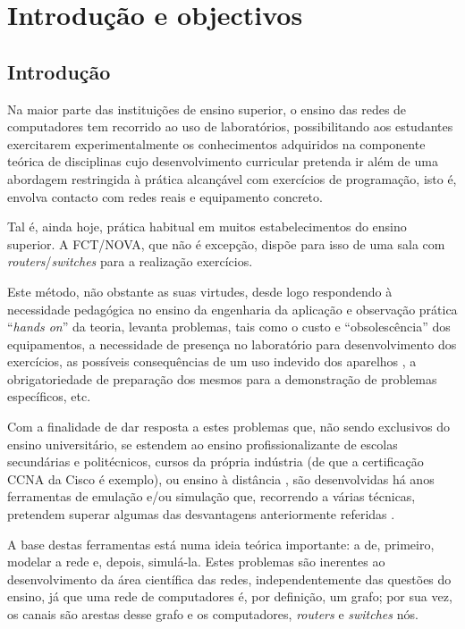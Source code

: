 
\chapter{Introdução e objectivos}

\section{Introdução}
\label{sec:intro}

Na maior parte das instituições de ensino superior, o ensino das redes de computadores tem recorrido ao uso de laboratórios, possibilitando aos estudantes exercitarem experimentalmente os conhecimentos adquiridos na componente teórica de disciplinas cujo desenvolvimento curricular pretenda ir além de uma abordagem restringida à prática alcançável com exercícios de programação, isto é, envolva contacto com redes reais e equipamento concreto.

Tal é, ainda hoje, prática habitual em muitos estabelecimentos do ensino superior. A FCT/NOVA, que não é excepção, dispõe para isso de uma sala com \emph{routers}/\emph{switches} para a realização exercícios.

Este método, não obstante as suas virtudes, desde logo respondendo à necessidade pedagógica no ensino da engenharia da aplicação e observação prática ``\emph{hands on}'' da teoria, levanta problemas, tais como o custo e ``obsolescência'' \cite{autonetconfiggns3} dos equipamentos, a necessidade de presença no laboratório para desenvolvimento dos exercícios, as possíveis consequências de um uso indevido dos aparelhos \cite{ZHANG2012504}, a obrigatoriedade de preparação dos mesmos para a demonstração de problemas específicos, etc.

Com a finalidade de dar resposta a estes problemas que, não sendo exclusivos do ensino universitário, se estendem ao ensino profissionalizante de escolas secundárias e politécnicos, cursos da própria indústria (de que a certificação CCNA da Cisco \cite{ccna} é exemplo), ou ensino à distância \cite{netvirtwithgns3}, são desenvolvidas há anos ferramentas de emulação e/ou simulação que, recorrendo a várias técnicas, pretendem superar algumas das desvantagens anteriormente referidas \cite{simandmod}.

A base destas ferramentas está numa ideia teórica importante: a de, primeiro, modelar a rede e, depois, simulá-la. Estes problemas são inerentes ao desenvolvimento da área científica das redes, independentemente das questões do ensino, já que uma rede de computadores é, por definição, um grafo; por sua vez, os canais são arestas desse grafo e os computadores, \emph{routers} e \emph{switches} nós.

